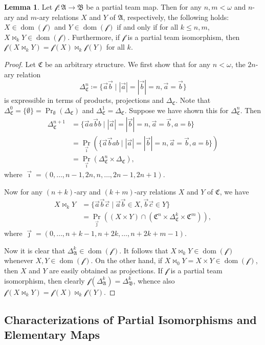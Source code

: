 \documentclass[a4paper]{amsart}
\theoremstyle{definition}
\newtheorem{lemma}[definition]{Lemma}
\theoremstyle{remark}
\newcommand{\A}{\mathcal{A}}
\newcommand{\B}{\mathcal{B}}
\newcommand{\C}{\mathcal{C}}
\DeclareMathOperator{\dom}{dom}
\theoremstyle{definition}
\renewcommand{\A}{\mathfrak{A}}
\renewcommand{\B}{\mathfrak{B}}
\renewcommand{\C}{\mathfrak{C}}
\newcommand{\f}{\mathcal{f}}
\begin{document}
\begin{lemma}
    Let $\f\colon\A\to\B$ be a partial team map. Then for any $n,m<\omega$ and $n$-ary and $m$-ary relations $X$ and $Y$ of $\A$, respectively, the following holds: $X\in\dom(\f)$ and $Y\in\dom(\f)$ if and only if for all $k\leq n,m$, $X\bowtie_k Y\in\dom(\f)$. Furthermore, if $\f$ is a partial team isomorphism, then $\f(X\bowtie_k Y) = \f(X)\bowtie_k\f(Y)$ for all $k$.
\end{lemma}
\begin{proof}
    Let $\C$ be an arbitrary structure. We first show that for any $n<\omega$, the $2n$-ary relation
    \[
        \Delta^n_\C \coloneqq \{ \vec a\vec b \mid |\vec a| = |\vec b| = n, \vec a = \vec b \}
    \]
    is expressible in terms of products, projections and $\Delta_\C$. Note that $\Delta^0_\C = \{\emptyset\} = \Pr_{\emptyset}(\Delta_\C)$ and $\Delta^1_\C = \Delta_\C$. Suppose we have shown this for $\Delta^n_\C$. Then
    \begin{align*}
        \Delta^{n+1}_\C &= \{ \vec a a\vec b b \mid |\vec a| = |\vec b| = n, \vec a = \vec b, a=b \} \\
        &= \Pr_{\vec\imath}(\{ \vec a\vec b ab \mid |\vec a| = |\vec b| = n, \vec a = \vec b, a=b \}) \\
        &= \Pr_{\vec\imath}(\Delta^n_\C\times\Delta_\C),
    \end{align*}
    where $\vec\imath = (0,\dots,n-1,2n,n,\dots,2n-1,2n+1)$.
    
    Now for any $(n+k)$-ary and $(k+m)$-ary relations $X$ and $Y$ of $\C$, we have
    \begin{align*}
        X\bowtie_k Y &= \{\vec a\vec b\vec c \mid \vec a\vec b\in X, \vec b\vec c\in Y\} \\
        &= \Pr_{\vec\jmath}((X\times Y)\cap(\C^n\times\Delta^k_\C\times\C^m)),
    \end{align*}
    where $\vec\jmath = (0,\dots,n+k-1,n+2k,\dots,n+2k+m-1)$.

    Now it is clear that $\Delta^k_\A\in\dom(\f)$. It follows that $X\bowtie_k Y\in\dom(\f)$ whenever $X,Y\in\dom(\f)$. On the other hand, if $X\bowtie_0 Y = X\times Y\in\dom(\f)$, then $X$ and $Y$ are easily obtained as projections. If $\f$ is a partial team isomorphism, then clearly $\f(\Delta^k_\A) = \Delta^k_\B$, whence also $\f(X\bowtie_k Y) = \f(X)\bowtie_k\f(Y)$.
\end{proof}





\subsection{Characterizations of Partial Isomorphisms and Elementary Maps}
\end{document}
